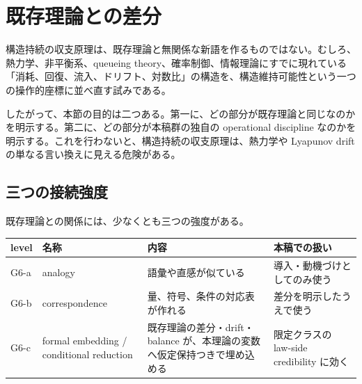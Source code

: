 \documentclass[12pt,a4paper]{article}
\begin{document}
\section{既存理論との差分}\label{ux65e2ux5b58ux7406ux8ad6ux3068ux306eux5deeux5206}

構造持続の収支原理は、既存理論と無関係な新語を作るものではない。むしろ、熱力学、非平衡系、queueing theory、確率制御、情報理論にすでに現れている「消耗、回復、流入、ドリフト、対数比」の構造を、構造維持可能性という一つの操作的座標に並べ直す試みである。

したがって、本節の目的は二つある。第一に、どの部分が既存理論と同じなのかを明示する。第二に、どの部分が本稿群の独自の operational discipline なのかを明示する。これを行わないと、構造持続の収支原理は、熱力学や Lyapunov drift の単なる言い換えに見える危険がある。

\subsection{三つの接続強度}\label{ux4e09ux3064ux306eux63a5ux7d9aux5f37ux5ea6}

既存理論との関係には、少なくとも三つの強度がある。

{\def\LTcaptype{table} %
\begin{longtable}[]{@{}
  >{\raggedright\arraybackslash}p{}
  >{\raggedright\arraybackslash}p{}
  >{\raggedright\arraybackslash}p{}
  >{\raggedright\arraybackslash}p{}@{}}
\toprule\noalign{}
\begin{minipage}[b]{\linewidth}\raggedright
level
\end{minipage} & \begin{minipage}[b]{\linewidth}\raggedright
名称
\end{minipage} & \begin{minipage}[b]{\linewidth}\raggedright
内容
\end{minipage} & \begin{minipage}[b]{\linewidth}\raggedright
本稿での扱い
\end{minipage} \\
\midrule\noalign{}
\endhead
\bottomrule\noalign{}
\endlastfoot
G6-a & analogy & 語彙や直感が似ている & 導入・動機づけとしてのみ使う \\
G6-b & correspondence & 量、符号、条件の対応表が作れる & 差分を明示したうえで使う \\
G6-c & formal embedding / conditional reduction & 既存理論の差分・drift・balance が、本理論の変数へ仮定保持つきで埋め込める & 限定クラスの law-side credibility に効く \\
\end{longtable}
}
\end{document}
